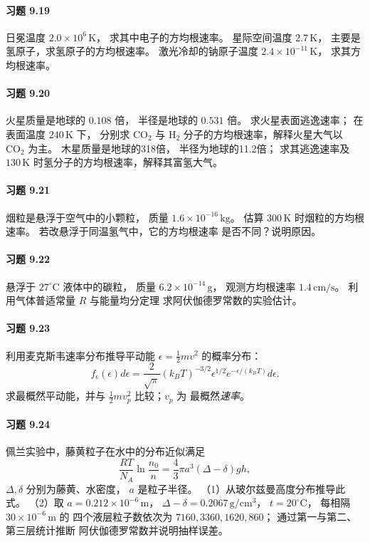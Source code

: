 \paragraph{习题 9.19}
日冕温度 \(2.0\times10^6\,\mathrm K\)，
求其中电子的方均根速率。
星际空间温度 \(2.7\,\mathrm K\)，
主要是氢原子，求氢原子的方均根速率。
激光冷却的钠原子温度
\(2.4\times10^{-11}\,\mathrm K\)，
求其方均根速率。

\paragraph{习题 9.20}
火星质量是地球的 \(0.108\) 倍，
半径是地球的 \(0.531\) 倍。
求火星表面逃逸速率；
在表面温度 \(240\,\mathrm K\) 下，
分别求 \(\mathrm{CO_2}\) 与 \(\mathrm{H_2}\)
分子的方均根速率，解释火星大气以
\(\mathrm{CO_2}\) 为主。
木星质量是地球的318倍，
半径为地球的11.2倍；
求其逃逸速率及 \(130\,\mathrm K\)
时氢分子的方均根速率，解释其富氢大气。

\paragraph{习题 9.21}
烟粒是悬浮于空气中的小颗粒，
质量 \(1.6\times10^{-16}\,\mathrm{kg}\)。
估算 \(300\,\mathrm K\) 时烟粒的方均根速率。
若改悬浮于同温氢气中，它的方均根速率
是否不同？说明原因。

\paragraph{习题 9.22}
悬浮于 \(27^\circ\mathrm C\) 液体中的碳粒，
质量 \(6.2\times10^{-14}\,\mathrm g\)，
观测方均根速率 \(1.4\,\mathrm{cm/s}\)。
利用气体普适常量 \(R\) 与能量均分定理
求阿伏伽德罗常数的实验估计。

\paragraph{习题 9.23}
利用麦克斯韦速率分布推导平动能
\(\epsilon=\tfrac12mv^2\) 的概率分布：
\[
 f_\epsilon(\epsilon)d\epsilon=
 \frac2{\sqrt\pi}(k_BT)^{-3/2}
 \epsilon^{1/2}e^{-\epsilon/(k_BT)}d\epsilon.
\]
求最概然平动能，并与
\(\tfrac12m v_p^2\) 比较；\(v_p\) 为
最概然\emph{速率}。

\paragraph{习题 9.24}
佩兰实验中，藤黄粒子在水中的分布近似满足
\[
 \frac{RT}{N_A}\ln\frac{n_0}{n}
 =\frac43\pi a^3(\Delta-\delta)gh,
\]
\(\Delta,\delta\) 分别为藤黄、水密度，
\(a\) 是粒子半径。
（1）从玻尔兹曼高度分布推导此式。
（2）取 \(a=0.212\times10^{-6}\,\mathrm m\)，
\(\Delta-\delta=0.2067\,\mathrm{g/cm^3}\)，
\(t=20^\circ\mathrm C\)，
每相隔 \(30\times10^{-6}\,\mathrm m\) 的
四个液层粒子数依次为
\(7160,3360,1620,860\)；
通过第一与第二、第三层统计推断
阿伏伽德罗常数并说明抽样误差。


